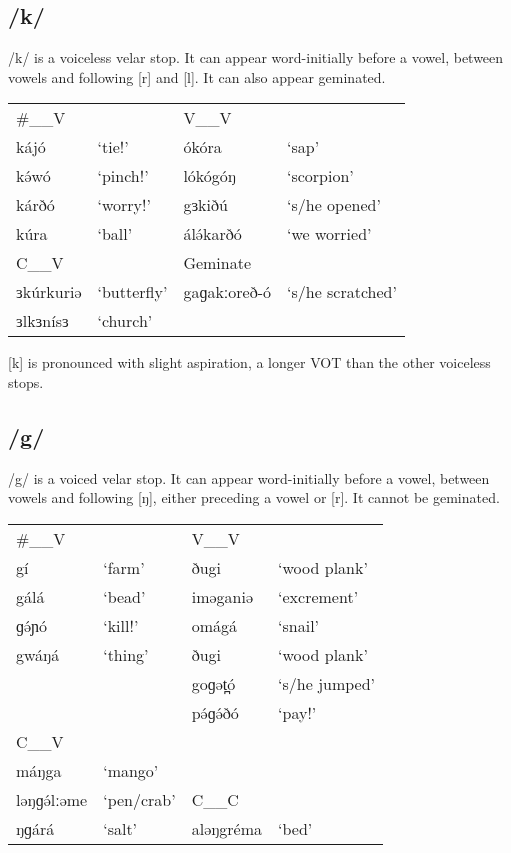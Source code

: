 \subsection{/k/}
/k/ is a voiceless velar stop. It can appear word-initially before a vowel, between vowels and following [r] and [l]. It can also appear geminated. 

\ea
\begin{tabular}[t]{llll}
\#\_\_V	&&	V\_\_V	\\
kájó	&‘tie!’		&ókóra		&‘sap’\\
kə́wó		&‘pinch!’	&lókógóŋ	&‘scorpion’\\
kárðó	&‘worry!’	&gɜkiðú		&‘s/he opened’\\
kúra	&‘ball’		&álə́karðó		&‘we worried’\\
\midrule				
C\_\_V		&&	Geminate	\\
\midrule
ɜkúrkuriə	&‘butterfly’		&gaɡakːoreð-ó	&‘s/he scratched’\\
ɜlkɜnísɜ	&‘church’		
\end{tabular}\label{ex:ch2:23}
\z 	

[k] is pronounced with slight aspiration, a longer VOT than the other voiceless stops. 


\subsection{/g/}\label{sec:ch2:g}
/g/ is a voiced velar stop. It can appear word-initially before a vowel, between vowels and following [ŋ], either preceding a vowel or [r]. It cannot be geminated. 

\ea 
\begin{tabular}[t]{llll}
\#\_\_V	&&	V\_\_V	\\
gí		&‘farm’		&ðugi		&‘wood plank’\\
gálá	&‘bead’		&iməganiə	&‘excrement’\\
ɡə́ɲó		&‘kill!’	&omágá		&‘snail’\\
gwáŋá	&‘thing’	&ðugi		&‘wood plank’\\
					&&goɡət̪ó	&‘s/he jumped’\\
					&&pə́ɡə́ðó	&‘pay!’\\
\midrule
C\_\_V			\\
\midrule
máŋga		&‘mango’	\\		
ləŋɡə́lːəme	&‘pen/crab’		&C\_\_C	\\
ŋɡárá		&‘salt’		&aləŋgréma	&‘bed’
\end{tabular}\label{ex:ch2:24}
\z 


